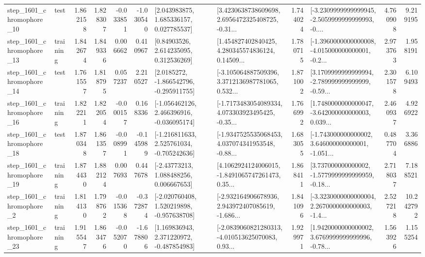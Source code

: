 \begin{tabular}{llrrrrllrlrr}
 step\_1601\_chromophore\_10 &      test &      1.862158 &    1.828307 &     -0.033851 & -1.030540 &     [2.043983875, 1.685336157, 0.027785537] &  [3.4230638738609698, 2.6956472325408725, -0.31... &       1.744024 &  [-3.2309999999999945, -2.5059999999999993, -0.... &            4.760908 &          9.219195 \\
 step\_1601\_chromophore\_13 &  training &      1.842674 &    1.849336 &      0.006662 &  0.410967 &      [0.84903526, 2.614235095, 0.312536269] &  [1.454827402840425, 4.280345574836124, 0.14509... &       1.780715 &  [-1.3960000000000008, -4.015000000000001, -0.2... &            2.973763 &          1.958191 \\
 step\_1601\_chromophore\_14 &      test &      1.761557 &    1.818795 &      0.057237 &  2.210527 &     [2.0185272, -1.866542796, -0.295911755] &  [-3.105064887509396, 3.3712136987781065, 0.532... &       1.871002 &  [3.1709999999999994, -2.789999999999999, -0.59... &            2.301578 &          6.109493 \\
 step\_1601\_chromophore\_16 &  training &      1.822211 &    1.822054 &     -0.000157 &  0.168336 &   [-1.056462126, 2.466396916, -0.036095174] &  [-1.7173483054089334, 4.073303923495425, -0.35... &       1.766992 &  [1.7480000000000047, -3.642000000000003, 0.039... &            2.460937 &          4.926922 \\
 step\_1601\_chromophore\_18 &      test &      1.870348 &    1.861357 &     -0.008991 & -0.145989 &   [-1.216811633, 2.525761034, -0.705242636] &  [-1.9347525535068453, 4.037074341953548, -0.88... &       1.683055 &  [-1.743000000000002, 3.646000000000001, -1.051... &            0.487704 &          3.366886 \\
 step\_1601\_chromophore\_19 &  training &      1.874430 &    1.882124 &      0.007693 &  0.447678 &     [-2.43773213, 1.088488256, 0.006667653] &  [4.1062924124006015, -1.8491065747261473, 0.35... &       1.868411 &  [3.737000000000002, -1.5779999999999959, -0.18... &            2.718037 &          7.188521 \\
  step\_1601\_chromophore\_2 &  training &      1.814130 &    1.798762 &     -0.015368 & -0.372874 &   [-2.020760408, 1.520219898, -0.957638708] &  [-2.932164906678936, 2.943972407085619, -1.686... &       1.841096 &  [-3.3230000000000004, 2.2670000000000003, -1.4... &            2.527218 &         10.242792 \\
 step\_1601\_chromophore\_23 &  training &      1.915547 &    1.863476 &     -0.052070 & -1.678806 &    [1.169836943, 2.371220972, -0.487854983] &  [-2.0839060821280313, -4.010513625070083, 0.93... &       1.929971 &  [1.9420000000000002, 3.6769999999999996, -0.78... &            1.563926 &          1.155254 \\

\end{tabular}
